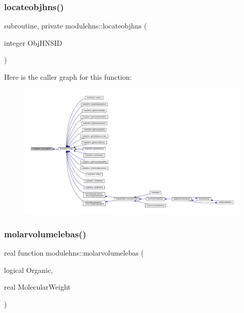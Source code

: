 \subsubsection{\texorpdfstring{locateobjhns()}{locateobjhns()}}
{\footnotesize\ttfamily subroutine, private modulehns\+::locateobjhns (\begin{DoxyParamCaption}\item[{integer}]{Obj\+H\+N\+S\+ID }\end{DoxyParamCaption})\hspace{0.3cm}{\ttfamily [private]}}

Here is the caller graph for this function\+:\nopagebreak
\begin{figure}[H]
\begin{center}
\leavevmode
\includegraphics[width=350pt]{namespacemodulehns_aff869b6b5dffbe4b2d00b777a1c0455d_icgraph}
\end{center}
\end{figure}
\mbox{\label{namespacemodulehns_a1d67c72bdca52544f6736edf0babb013}} 
\subsubsection{\texorpdfstring{molarvolumelebas()}{molarvolumelebas()}}
{\footnotesize\ttfamily real function modulehns\+::molarvolumelebas (\begin{DoxyParamCaption}\item[{logical}]{Organic,  }\item[{real}]{Molecular\+Weight }\end{DoxyParamCaption})\hspace{0.3cm}{\ttfamily [private]}}

